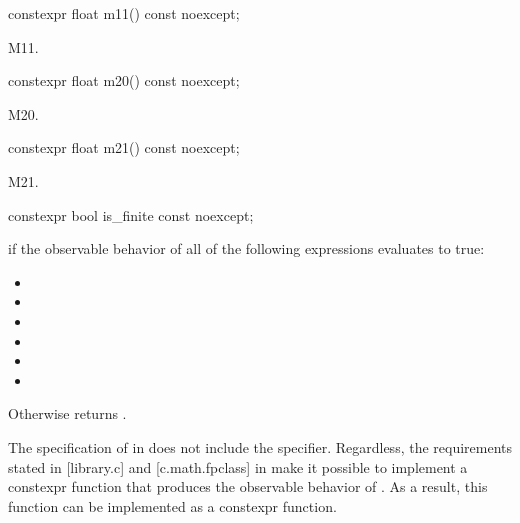 %
\begin{itemdecl}
constexpr float m11() const noexcept;
\end{itemdecl}
\begin{itemdescr}
\pnum
\returns
M11.
\end{itemdescr}

%
\begin{itemdecl}
constexpr float m20() const noexcept;
\end{itemdecl}
\begin{itemdescr}
\pnum
\returns
M20.
\end{itemdescr}

%
\begin{itemdecl}
constexpr float m21() const noexcept;
\end{itemdecl}
\begin{itemdescr}
\pnum
\returns
M21.
\end{itemdescr}

%
\begin{itemdecl}
constexpr bool is_finite const noexcept;
\end{itemdecl}
\begin{itemdescr}
\pnum
\returns
{} if the observable behavior of all of the following expressions evaluates to true:
\begin{itemize}
\item {}
\item {}
\item {}
\item {}
\item {}
\item {}
\end{itemize}

\pnum
Otherwise returns .

\pnum
\begin{note}
The specification of  in \cppseventeen does not include the  specifier. Regardless, the requirements stated in [library.c] and [c.math.fpclass] in \cppseventeen make it possible to implement a constexpr function that produces the observable behavior of . As a result, this function can be implemented as a constexpr function.
\end{note}
\end{itemdescr}

